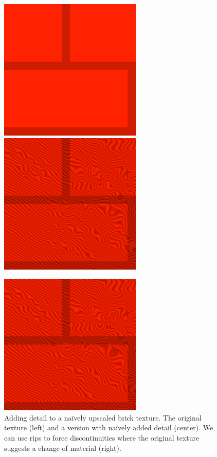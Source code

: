 \documentclass{utue} %
\begin{document}
\begin{figure}[ht]
  \centering
  \includegraphics[width=0.49\linewidth]{images/brick}
  \includegraphics[width=0.49\linewidth]{images/brickSimple}

  \vspace{2pt}

  \includegraphics[width=0.49\linewidth]{images/brickRespecting}
  \caption{Adding detail to a na\"ively upscaled brick texture. The original texture (left) and a version with na\"ively added detail (center). We can use rips to force discontinuities where the original texture suggests a change of material (right).}\label{fig:bricks}
\end{figure}
\end{document}
